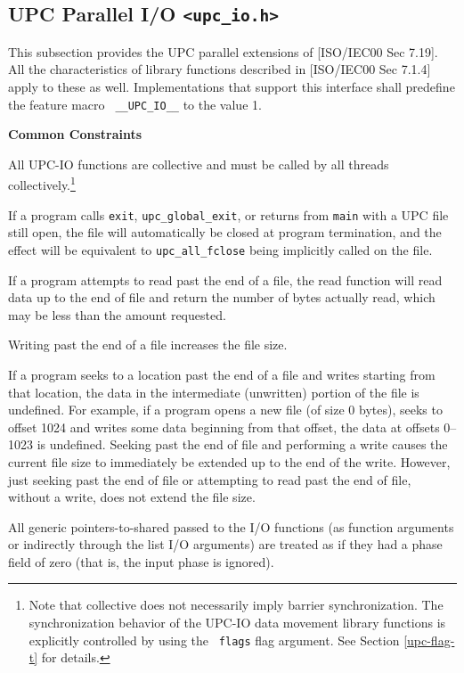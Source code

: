 \subsection{UPC Parallel I/O {\tt <upc\_io.h>}}

\npf This subsection provides the UPC parallel extensions of [ISO/IEC00 
    Sec 7.19].  All the characteristics of library functions described
    in [ISO/IEC00 Sec 7.1.4] apply to these as well.  Implementations
    that support this interface shall predefine the feature macro {\tt
    \_\_UPC\_IO\_\_} to the value 1.

{\bf Common Constraints}

\np All UPC-IO functions are collective and must be called by all threads collectively.\footnote{Note that 
collective does not necessarily imply barrier synchronization.  The synchronization behavior of the 
UPC-IO data movement library functions is explicitly controlled by using the {\tt
flags} flag argument. See Section \ref{upc-flag-t} for details.}

\np If a program calls {\tt exit}, {\tt upc\_global\_exit}, or returns from {\tt main} with a
UPC file still open, the file will automatically be closed at program
termination, and the effect will be equivalent to {\tt upc\_all\_fclose} being
implicitly called on the file.

\np If a program attempts to read past the end of a file, the read function
will read data up to the end of file and return the number of bytes actually
read, which may be less than the amount requested.

\np Writing past the end of a file increases the file size.

\np If a program seeks to a location past the end of a file and writes
starting from that location, the data in the intermediate (unwritten)
portion of the file is undefined. For example, if a program opens a new file
(of size 0 bytes), seeks to offset 1024 and writes some data beginning from
that offset, the data at offsets 0--1023 is undefined. Seeking past the end
of file and performing a write causes the current file size to immediately
be extended up to the end of the write. However, just seeking past the end
of file or attempting to read past the end of file, without a write, does
not extend the file size.

\np All generic pointers-to-shared passed to the I/O functions (as function
arguments or indirectly through the list I/O arguments) are treated as if
they had a phase field of zero (that is, the input phase is ignored).


